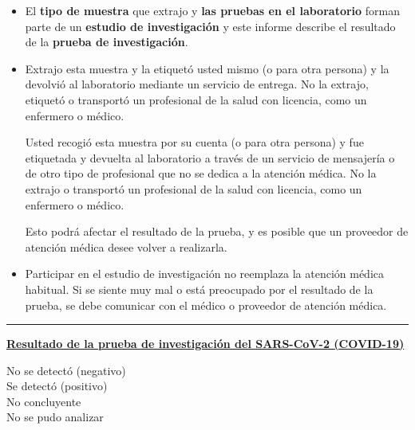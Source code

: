 \documentclass[10pt]{article}
\newcommand{\PageLine}{\rule{\textwidth}{0.25mm}}
\begin{document}
\begin{itemize}
\item

  El \textbf{tipo de muestra} que extrajo y \textbf{las pruebas en el
  laboratorio} forman parte de un \textbf{estudio de investigación} y este
  informe describe el resultado de la \textbf{prueba de investigación}.

\item
  Extrajo esta muestra y la etiquetó usted mismo (o para otra persona) y la
  devolvió al laboratorio mediante un servicio de entrega. No la extrajo,
  etiquetó o transportó un profesional de la salud con licencia, como un
  enfermero o médico.

  Usted recogió esta muestra por su cuenta (o para otra persona) y fue etiquetada
  y devuelta al laboratorio a través de un servicio de mensajería o de otro
  tipo de profesional que no se dedica a la atención médica.  No la extrajo o
  transportó un profesional de la salud con licencia, como un enfermero o
  médico.



  Esto podrá afectar el resultado de la prueba, y es posible que un proveedor de
  atención médica desee volver a realizarla.

\item

  Participar en el estudio de investigación no reemplaza la atención médica
  habitual. Si se siente muy mal o está preocupado por el resultado de la
  prueba, se debe comunicar con el médico o proveedor de atención médica.

\end{itemize}

\bigskip
\PageLine

\large \underline{\textbf{Resultado de la prueba de investigación del SARS-CoV-2
  (COVID-19)}}

No se detectó (negativo)\\
Se detectó (positivo)\\
No concluyente\\
No se pudo analizar\\
\end{document}
